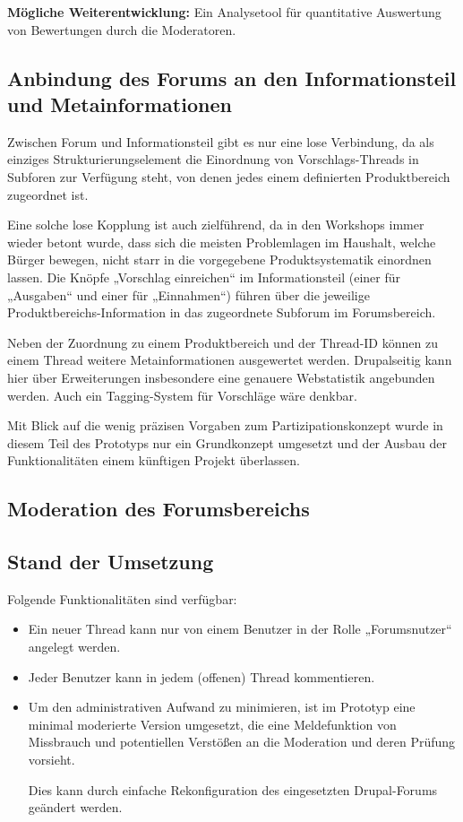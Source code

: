 \documentclass[11pt,a4paper,twoside]{article}
\begin{document}
\textbf{Mögliche Weiterentwicklung:} Ein Analysetool für quantitative
Auswertung von Bewertungen durch die Moderatoren.

\subsection*{Anbindung des Forums an den Informationsteil und
  Metainformationen}  

Zwischen Forum und Informationsteil gibt es nur eine lose Verbindung, da als
einziges Strukturierungselement die Einordnung von Vorschlags-Threads in
Subforen zur Verfügung steht, von denen jedes einem definierten Produktbereich
zugeordnet ist.  

Eine solche lose Kopplung ist auch zielführend, da in den Workshops immer
wieder betont wurde, dass sich die meisten Problemlagen im Haushalt, welche
Bürger bewegen, nicht starr in die vorgegebene Produktsystematik einordnen
lassen.  Die Knöpfe „Vorschlag einreichen“ im Informationsteil (einer für
„Ausgaben“ und einer für „Einnahmen“) führen über die jeweilige
Produktbereichs-Information in das zugeordnete Subforum im Forumsbereich.

Neben der Zuordnung zu einem Produktbereich und der Thread-ID können zu einem
Thread weitere Metainformationen ausgewertet werden.  Drupalseitig kann hier
über Erweiterungen insbesondere eine genauere Webstatistik angebunden werden.
Auch ein Tagging-System für Vorschläge wäre denkbar. 

Mit Blick auf die wenig präzisen Vorgaben zum Partizipationskonzept wurde in
diesem Teil des Prototyps nur ein Grundkonzept umgesetzt und der Ausbau der
Funktionalitäten einem künftigen Projekt überlassen. 

\subsection{Moderation des Forumsbereichs} 

\subsection*{Stand der Umsetzung} 

Folgende Funktionalitäten sind verfügbar:
\begin{itemize}\itemsep0pt 
\item Ein neuer Thread kann nur von einem Benutzer in der Rolle „Forumsnutzer“
  angelegt werden.
\item Jeder Benutzer kann in jedem (offenen) Thread kommentieren. 
\item Um den administrativen Aufwand zu minimieren, ist im Prototyp eine minimal
  moderierte Version umgesetzt, die eine Meldefunktion von Missbrauch und
  potentiellen Verstößen an die Moderation und deren Prüfung vorsieht.  

  Dies kann durch einfache Rekonfiguration des eingesetzten Drupal-Forums
  geändert werden. 
\end{itemize}
\end{document}
